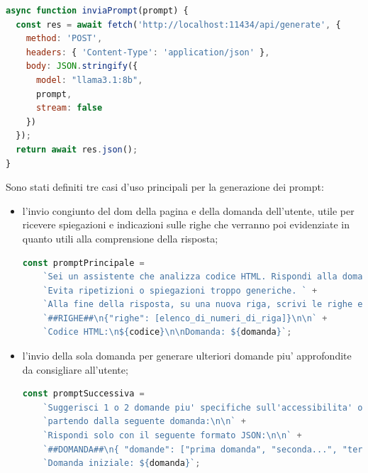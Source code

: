 \begin{lstlisting}[language=JavaScript, caption={Funzione di interazione con Ollama}]
async function inviaPrompt(prompt) {
  const res = await fetch('http://localhost:11434/api/generate', {
    method: 'POST',
    headers: { 'Content-Type': 'application/json' },
    body: JSON.stringify({
      model: "llama3.1:8b",
      prompt,
      stream: false
    })
  });
  return await res.json();
}
\end{lstlisting}

\noindent Sono stati definiti tre casi d’uso principali per la generazione dei prompt: 
\begin{itemize}
    \item l’invio congiunto del \acrshort{dom} della pagina e della domanda dell’utente, utile per ricevere spiegazioni e indicazioni sulle righe che verranno poi evidenziate in quanto utili alla comprensione della risposta; 
    \begin{lstlisting}[language=JavaScript, caption={Prompt per la generazione di risposta e righe da evidenziare}]
    const promptPrincipale =
    `Sei un assistente che analizza codice HTML. Rispondi alla domanda in modo chiaro ma conciso, usando al massimo 5-6 frasi. ` +
    `Evita ripetizioni o spiegazioni troppo generiche. ` +
    `Alla fine della risposta, su una nuova riga, scrivi le righe eventualmente utilizzate per la risposta nel seguente formato:\n\n` +
    `##RIGHE##\n{"righe": [elenco_di_numeri_di_riga]}\n\n` +
    `Codice HTML:\n${codice}\n\nDomanda: ${domanda}`;
    \end{lstlisting}
    
    \item l'invio della sola domanda per generare ulteriori domande piu' approfondite da consigliare all'utente;
    \begin{lstlisting}[language=JavaScript, caption={Prompt per la generazione di domande successive}]
    const promptSuccessiva =
    `Suggerisci 1 o 2 domande piu' specifiche sull'accessibilita' o sull'analisi del codice, ` +
    `partendo dalla seguente domanda:\n\n` +
    `Rispondi solo con il seguente formato JSON:\n\n` +
    `##DOMANDA##\n{ "domande": ["prima domanda", "seconda...", "terza..."] }\n\n` +
    `Domanda iniziale: ${domanda}`;
    \end{lstlisting}


\end{itemize}
